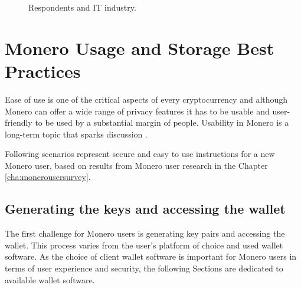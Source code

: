 \documentclass[
  printed, %
  table,   %
  lof,     %
  lot,     %
           oneside, color
]{fithesis3}
\begin{document}
\begin{center}
\begin{figure}[H]
\caption{Respondents and IT industry.}
\label{chart:itindustryuserresearch}\end{figure}\end{center}

\chapter{Monero Usage and Storage Best Practices}
Ease of use is one of the critical aspects of every cryptocurrency and although Monero can offer a wide range of privacy features it has to be usable and user-friendly to be used by a substantial margin of people. Usability in Monero is a long-term topic that sparks discussion \cite{monerolang2018}.

Following scenarios represent secure and easy to use instructions for a new Monero user, based on results from Monero user research in the Chapter \ref{cha:monerousersurvey}.

\section{Generating the keys and accessing the wallet}
The first challenge for Monero users is generating key pairs and accessing the wallet. This process varies from the user's platform of choice and used wallet software. As the choice of client wallet software is important for Monero users in terms of user experience and security, the following Sections are dedicated to available wallet software. %
\end{document}
